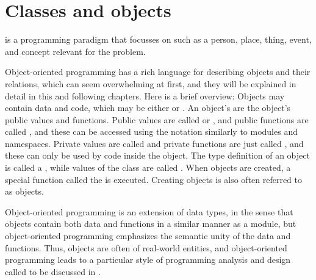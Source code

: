 \chapter{Classes and objects}
\label{chap:oop}

 is a programming paradigm that focusses on  such as a person, place, thing, event, and concept relevant for the problem.

Object-oriented programming has a rich language for describing objects and their relations, which can seem overwhelming at first, and they will be explained in detail in this and following chapters. Here is a brief overview: Objects may contain data and code, which may be either  or . An object's  are the object's public values and functions. Public values are called  or , and public functions are called , and these can be accessed using the  notation similarly to modules and namespaces. Private values are called  and private functions are just called , and these can only be used by code inside the object. The type definition of an object is called a , while values of the class are called . When objects are created, a special function called the  is executed. Creating objects is also often referred to as  objects.

Object-oriented programming is an extension of data types, in the sense that objects contain both data and functions in a similar manner as a module, but object-oriented programming emphasizes the semantic unity of the data and functions. Thus, objects are often  of real-world entities, and object-oriented programming leads to a particular style of programming analysis and design called  to be discussed in . 

